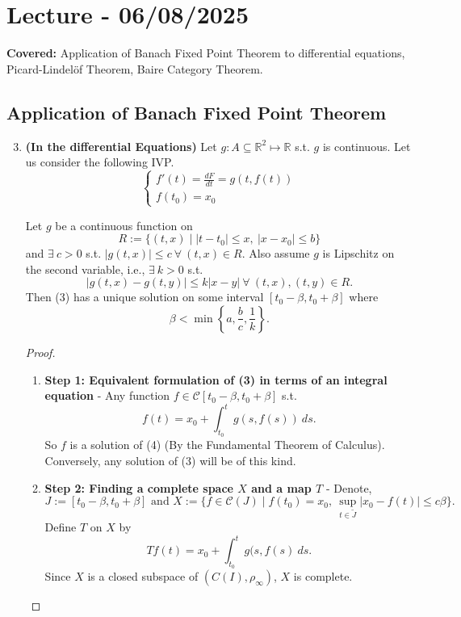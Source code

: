 \documentclass{functionspaces}
\begin{document}
\endgroup


\newpage
\section{Lecture - 06/08/2025}
\textbf{Covered:} Application of Banach Fixed Point Theorem to differential equations, Picard-Lindelöf Theorem, Baire Category Theorem.

\begingroup
\setlength{\parskip}{6pt}
\setlength{\parindent}{0pt}

\subsection{Application of Banach Fixed Point Theorem}

\begin{enumerate}
\setcounter{enumi}{2}
\item \textbf{(In the differential Equations)} Let $g:A\subseteq\mathbb{R}^{2}\mapsto\mathbb{R}$ s.t. $g$ is continuous. Let us consider the following IVP.
\[
\begin{cases}
f'(t)=\frac{dF}{dt}=g(t,f(t)) \\
f(t_{0})=x_{0}
\end{cases} \tag{3}
\]

\begin{theorem}
Let $g$ be a continuous function on
\[
R:=\{(t,x)\mid|t-t_{0}|\leq x,\ |x-x_{0}|\leq b\}
\]
and $\exists\ c>0$ s.t. $|g(t,x)|\leq c\ \forall\ (t,x)\in R.$ Also assume $g$ is Lipschitz on the second variable, i.e., $\exists\ k>0$ s.t.
\[
|g(t,x)-g(t,y)|\leq k|x-y|\ \forall\ (t,x),(t,y)\in R.
\]
Then (3) has a unique solution on some interval $[t_{0}-\beta,t_{0}+\beta]$ where
\[
\beta<\min\left\{a,\frac{b}{c},\frac{1}{k}\right\}.
\]
\end{theorem}

\begin{proof}
\begin{enumerate}
\item[(a)] \textbf{Step 1: Equivalent formulation of (3) in terms of an integral equation} - Any function $f\in\mathcal{C}[t_{0}-\beta,t_{0}+\beta]$ s.t.
\[
f(t)=x_{0}+\int_{t_{0}}^{t}g(s,f(s))\ ds. \tag{4}
\]
So $f$ is a solution of (4) (By the Fundamental Theorem of Calculus). Conversely, any solution of (3) will be of this kind.

\item[(b)] \textbf{Step 2: Finding a complete space $X$ and a map $T$} - Denote,
\[
J:=[t_{0}-\beta,t_{0}+\beta]\text{ and }X:=\{f\in\mathcal{C}(J)\mid f(t_{0})=x_{0},\ \sup_{t\in\tilde{J}}|x_{0}-f(t)|\leq c\beta\}.
\]
Define $T$ on $X$ by
\[
Tf(t)=x_{0}+\int_{t_{0}}^{t}g(s,f(s)\ ds.
\]
Since $X$ is a closed subspace of $(C(I),\rho_{\infty})$, $X$ is complete.


\end{enumerate}
\end{proof}
\end{enumerate}
\end{document}
